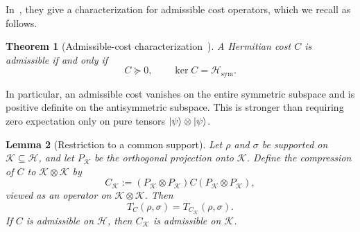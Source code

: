 \documentclass[11pt]{article}
\newtheorem{theorem}{Theorem}[section]
\newtheorem{lemma}[theorem]{Lemma}
\DeclarePairedDelimiter\ket{\lvert}{\rangle}
\newcommand{\calH}{\mathcal{H}}
\newcommand{\calK}{\mathcal{K}}
\begin{document}
In~\cite{CEFZ23}, they give a characterization for admissible cost operators, which we recall as follows.

\begin{theorem}[Admissible-cost characterization~{\cite[Theorem~6.3]{CEFZ23}}]\label{thm:admissible-costs}
    A Hermitian cost $C$ is admissible if and only if
    \begin{equation}\label{eq:admissible-cost}
        C\succeq0,
        \qquad
        \ker C=\calH_{\mathrm{sym}}.
    \end{equation}
\end{theorem}

In particular, an admissible cost vanishes on the entire symmetric subspace
and is positive definite on the antisymmetric subspace.  This is stronger
than requiring zero expectation only on pure tensors $\ket{\psi}\otimes \ket{\psi}$.

\begin{lemma}[Restriction to a common support]\label{lem:common-support}
    Let $\rho$ and $\sigma$ be supported on $\calK\subseteq\calH$, and let
    $P_{\calK}$ be the orthogonal projection onto $\calK$.  Define the
    compression of $C$ to $\calK\otimes\calK$ by
    \[
        C_{\calK}
        :=(P_{\calK}\otimes P_{\calK})
          C
          (P_{\calK}\otimes P_{\calK}),
    \]
    viewed as an operator on $\calK\otimes\calK$.
    Then
    \[
        T_C(\rho,\sigma)=T_{C_{\calK}}(\rho,\sigma).
    \]
    If $C$ is admissible on $\calH$, then $C_{\calK}$ is admissible on
    $\calK$.
\end{lemma}
\end{document}
